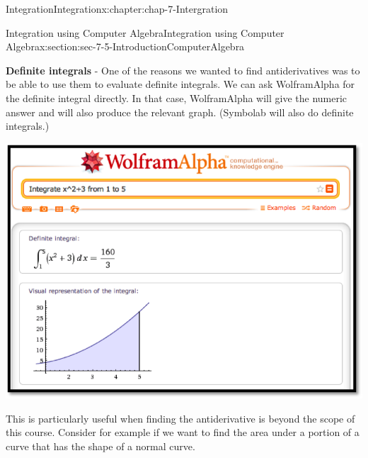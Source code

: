 \documentclass[oneside,10pt,]{book}
\newcommand{\terminology}[1]{\textbf{#1}}
\numberwithin{equation}{section}
\begin{document}
\begin{chapterptx}{Integration}{}{Integration}{}{}{x:chapter:chap-7-Intergration}
\begin{sectionptx}{Integration using Computer Algebra}{}{Integration using Computer Algebra}{}{}{x:section:sec-7-5-IntroductionComputerAlgebra}
\begin{sidebyside}{1}{0.05}{0.05}{0}
\begin{sbspanel}{0.9}
\end{sbspanel}%
\end{sidebyside}%
\par
\terminology{Definite integrals} - One of the reasons we wanted to find antiderivatives was to be able to use them to evaluate definite integrals.  We can ask Wolfram\textbar{}Alpha for the definite integral directly.  In that case, Wolfram\textbar{}Alpha will give the numeric answer and will also produce the relevant graph.  (Symbolab will also do definite integrals.)%
\begin{sidebyside}{1}{0.05}{0.05}{0}%
\begin{sbspanel}{0.9}%
\includegraphics[width=\linewidth]{images/sec7-5-11.png}
\end{sbspanel}%
\end{sidebyside}%
\par
This is particularly useful when finding the antiderivative is beyond the scope of this course.  Consider for example if we want to find the area under a portion of a curve that has the shape of a normal curve.%
\begin{sidebyside}{1}{0.05}{0.05}{0}%
\begin{sbspanel}{0.9}%

\end{sbspanel}
\end{sidebyside}
\end{sectionptx}
\end{chapterptx}
\end{document}
